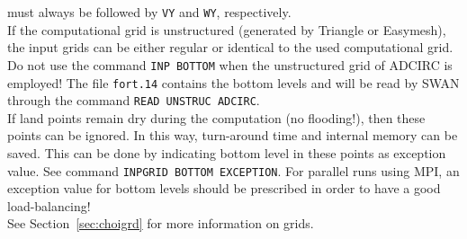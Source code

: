 \documentclass[12pt]{book}
\begin{document}
must always be followed by {\tt VY} and {\tt WY}, respectively.
\\[2ex]
\noindent
If the computational grid is unstructured (generated by Triangle or Easymesh), the input grids can be either regular
or identical to the used computational grid.
\\[2ex]
\noindent
Do not use the command {\tt INP BOTTOM} when the unstructured grid of ADCIRC is employed!
The file {\tt fort.14} contains the bottom levels and will be read by SWAN through the command {\tt READ UNSTRUC ADCIRC}.
\\[2ex]
\noindent
If land points remain dry during the computation (no flooding!), then these points can be ignored.
In this way, turn-around time and internal memory can be saved. This can be done by indicating bottom level in these points as
exception value. See command {\tt INPGRID BOTTOM EXCEPTION}.
For parallel runs using MPI, an exception value for bottom levels should be prescribed in order
to have a good load-balancing!
\\[2ex]
\noindent
See Section~\ref{sec:choigrd} for more information on grids.
\end{document}
